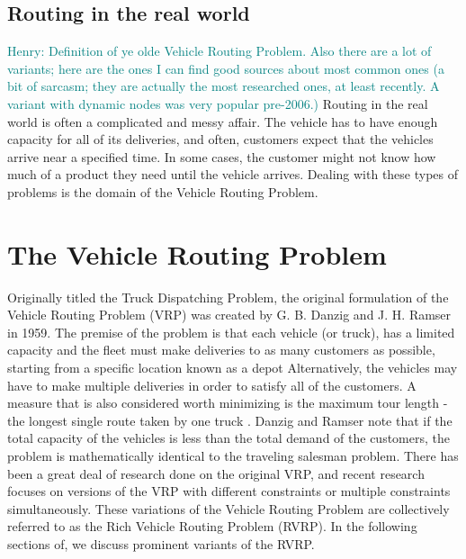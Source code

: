 \documentclass{sig-alternate}
\newcommand{\allcomments}[1]{{#1}}
\newcommand{\hfcomment}[1]{\textcolor{Teal}{\allcomments{Henry: {#1}}}}
\begin{document}
\subsection{Routing in the real world}
\label{ssec:real}
\hfcomment{Definition of ye olde Vehicle Routing Problem. Also there are a lot of variants; here are the ones I can find good sources about most common ones (a bit of sarcasm; they are actually the most researched ones, at least recently. A variant with dynamic nodes was very popular pre-2006.)}
Routing in the real world is often a complicated and messy affair. The vehicle has to have enough capacity for all of its deliveries, and often, customers expect that the vehicles arrive near a specified time. In some cases, the customer might not know how much of a product they need until the vehicle arrives. Dealing with these types of problems is the domain of the Vehicle Routing Problem.
\section{The Vehicle Routing Problem}
\label{sec:VRP}
Originally titled the Truck Dispatching Problem, the original formulation of the Vehicle Routing Problem (VRP) was created by G. B. Danzig and J. H. Ramser in 1959\cite{Danzig:1959}. The premise of the problem is that each vehicle (or truck), has a limited capacity and the fleet must make deliveries to as many customers as possible, starting from a specific location known as a depot\cite{Caceres-Cruz:2014} Alternatively, the vehicles may have to make multiple deliveries in order to satisfy all of the customers. A measure that is also considered worth minimizing is the maximum tour length - the longest single route taken by one truck \cite{Caceres-Cruz:2014}. Danzig and Ramser note that if the total capacity of the vehicles is less than the total demand of the customers, the problem is mathematically identical to the traveling salesman problem. There has been a great deal of research done on the original VRP, and recent research focuses on versions of the VRP with different constraints or multiple constraints simultaneously. These variations of the Vehicle Routing Problem are collectively referred to as the Rich Vehicle Routing Problem\cite{Caceres-Cruz:2014} (RVRP). In the following sections of, we discuss prominent variants of the RVRP.
\end{document}
